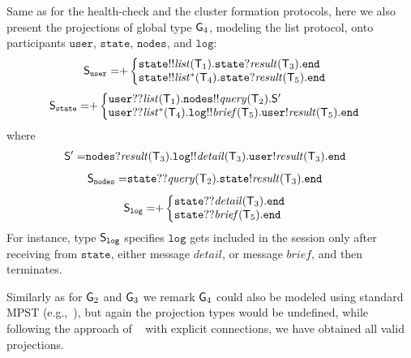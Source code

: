 Same as for the health-check and the cluster formation protocols, here we also present the projections of global type ${\sf G}_4$, modeling the list protocol, onto participants $\mathtt{user}$, $\mathtt{state}$, $\mathtt{nodes}$, and $\mathtt{log}$:
\begin{align*}
	\ST_\mathtt{user} =& 
	{+}
	\left\{
	\begin{array}{@{}l@{}}  
	\mathtt{state}{!!}\mathit{list}(\T_1).\mathtt{state}{?}\mathit{result}(\T_3).\tend \\
	\mathtt{state}{!!}\mathit{list^*}(\T_4).\mathtt{state}{?}\mathit{result}(\T_5).\tend 
	\end{array} \right.
\end{align*}
\begin{align*}
	\ST_\mathtt{state} =&
	{+}
	\left\{
	\begin{array}{@{}l@{}}  
	\mathtt{user}{??}\mathit{list}(\T_1).\mathtt{nodes}{!!}\mathit{query}(\T_2).\ST'\\
	\mathtt{user}{??}\mathit{list^*}(\T_4).\mathtt{log}{!!}\mathit{brief}(\T_5).\mathtt{user}{!}\mathit{result}(\T_5).\tend
	\end{array} \right. 
\end{align*}
where
\begin{align*}
	{\mathsf S}'  =& 
	\mathtt{nodes}{?}\mathit{result}({\mathsf T}_3).\mathtt{log}{!!}\mathit{detail}({\mathsf T}_3).\mathtt{user}{!}\mathit{result}({\mathsf T}_3).\mathtt{end}
\end{align*}
\begin{align*}
	{\mathsf S}_\mathtt{nodes} = &
	\mathtt{state}{??}\mathit{query}({\mathsf T}_2).\mathtt{state}{!}\mathit{result}({\mathsf T}_3).\mathtt{end}
\end{align*}
\begin{align*}
	\ST_\mathtt{log} = & 
	{+}
	\left\{
	\begin{array}{@{}l@{}}  
	\mathtt{state}{??}\mathit{detail}(\T_3).\tend \\
	\mathtt{state}{??}\mathit{brief}(\T_5).\tend \\
	\end{array} \right.
\end{align*}
For instance, type ${\mathsf S}_\mathtt{log}$ specifies $\mathtt{log}$ gets included in the session only after receiving from $\mathtt{state}$, either message $\mathit{detail}$, or message $\mathit{brief}$, and then terminates. 

Similarly as for ${\sf G}_2$ and ${\sf G}_3$ we remark ${\sf G}_4$ could also be modeled using standard MPST (e.g.,~\cite{HondaYC08}), but again the projection types would be undefined, while following the approach of ~\cite{HuY17} with explicit connections, we have obtained all valid projections.
%
%
